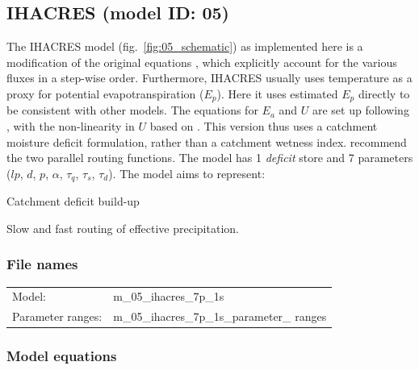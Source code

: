 \subsection{IHACRES (model ID: 05)}
The IHACRES model (fig.~\ref{fig:05_schematic}) as implemented here is a modification of the original equations \citep{Littlewood1997,Ye1997,Croke2004}, which explicitly account for the various fluxes in a step-wise order. 
Furthermore, IHACRES usually uses temperature as a proxy for potential evapotranspiration ($E_p$). 
Here it  uses estimated $E_p$ directly to be consistent with other models. 
The equations for $E_a$ and $U$ are set up following \citet{Croke2004}, with the non-linearity in $U$ based on \citet{Ye1997}. 
This version thus uses a catchment moisture deficit formulation, rather than a catchment wetness index.
\citet{Littlewood1997} recommend the two parallel routing functions. 
The model has 1 \emph{deficit} store and 7 parameters ($lp$, $d$, $p$, $\alpha$, $\tau_q$, $\tau_s$, $\tau_d$). 
The model aims to represent:

\begin{itemizecompact}
\item Catchment deficit build-up
\item Slow and fast routing of effective precipitation.
\end{itemizecompact}

\subsubsection{File names}
\begin{tabular}{@{}ll}
Model: &m\_05\_ihacres\_7p\_1s \\
Parameter ranges: &m\_05\_ihacres\_7p\_1s\_parameter\_ ranges \\
\end{tabular}

\subsubsection{Model equations}

